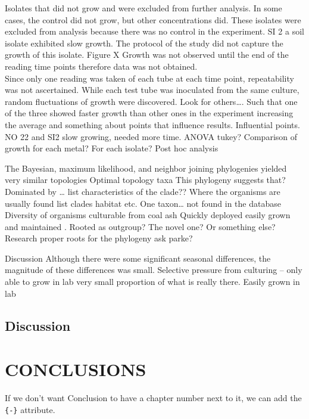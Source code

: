 \documentclass[ms]{uncgdissertationexp}
\theoremstyle{plain}
\theoremstyle{definition}
\theoremstyle{remark}
\begin{document}
  Isolates that did not grow and were excluded from further analysis. In
  some cases, the control did not grow, but other concentrations did.
  These isolates were excluded from analysis because there was no control
  in the experiment. SI 2 a soil isolate exhibited slow growth. The
  protocol of the study did not capture the growth of this isolate. Figure
  X Growth was not observed until the end of the reading time points
  therefore data was not obtained.\\
  Since only one reading was taken of each tube at each time point,
  repeatability was not ascertained. While each test tube was inoculated
  from the same culture, random fluctuations of growth were discovered.
  Look for others\ldots{}. Such that one of the three showed faster growth
  than other ones in the experiment increasing the average and something
  about points that influence results. Influential points. NO 22 and SI2
  slow growing, needed more time. ANOVA tukey? Comparison of growth for
  each metal? For each isolate? Post hoc analysis
  
  The Bayesian, maximum likelihood, and neighbor joining phylogenies
  yielded very similar topologies Optimal topology taxa This phylogeny
  suggests that? Dominated by \ldots{} list characteristics of the clade??
  Where the organisms are usually found list clades habitat etc. One
  taxon\ldots{} not found in the database Diversity of organisms
  culturable from coal ash Quickly deployed easily grown and maintained .
  Rooted as outgroup? The novel one? Or something else? Research proper
  roots for the phylogeny ask parke?
  
  Discussion Although there were some significant seasonal differences,
  the magnitude of these differences was small. Selective pressure from
  culturing -- only able to grow in lab very small proportion of what is
  really there. Easily grown in lab
  
  \section{Discussion}\label{discussion-1}
  
  \chapter{CONCLUSIONS}\label{conclusions}
  
  If we don't want Conclusion to have a chapter number next to it, we can
  add the \texttt{\{-\}} attribute.
  
\end{document}
